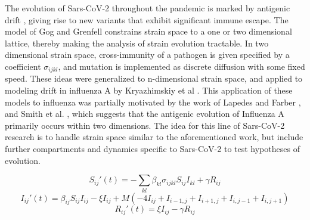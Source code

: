 \documentclass{article}
\begin{document}
The evolution of Sars-CoV-2 throughout the pandemic is marked by antigenic drift \cite{yewdellAntigenicDriftUnderstanding2021}, giving rise to new variants that exhibit significant immune escape. The model of Gog and Grenfell \cite{gogDynamicsSelectionManystrain2002} constrains strain space to a one or two dimensional lattice, thereby making the analysis of strain evolution tractable. In two dimensional strain space, cross-immunity of a pathogen is given specified by a coefficient $\sigma_{ijkl}$, and mutation is implemented as discrete diffusion with some fixed speed. These ideas were generalized to n-dimensional strain space, and applied to modeling drift in influenza A by Kryazhimskiy et al \cite{kryazhimskiyStateSpaceReductionMultiStrain2007}. This application of these models to influenza was partially motivated by the work of Lapedes and Farber \cite{lapedesGeometryShapeSpace2001}, and Smith et al. \cite{smithMappingAntigenicGenetic2004}, which suggests that the antigenic evolution of Influenza A primarily occurs within two dimensions.
The idea for this line of Sars-CoV-2 research is to handle strain space similar to the aforementioned work, but include further compartments and dynamics specific to Sars-CoV-2 to test hypotheses of evolution. 


\begin{equation}
    S_{ij}'(t) = -\sum_{kl} \beta_{kl} \sigma_{ijkl} S_{ij} I_{kl} + \gamma R_{ij}  \label{Seqn}
\end{equation}
\begin{equation}
    I_{ij}'(t) = \beta_{ij} S_{ij} I_{ij} - \xi I_{ij} + M \left(- 4I_{ij} + I_{i-1,j}  + I_{i+1,j} + I_{i,j-1} + I_{i,j+1} \right) \label{Ieqn}    
\end{equation}
\begin{equation}
    R_{ij}'(t) = \xi I_{ij} - \gamma R_{ij}  \label{Reqn}
\end{equation}
\end{document}
